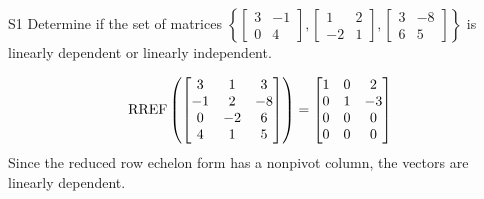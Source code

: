 \documentclass{sbgLAquiz}
\begin{document}
\begin{problem}{S1} 
Determine if the set of matrices $\left\{\begin{bmatrix} 3 & -1 \\ 0 & 4 \end{bmatrix}, \begin{bmatrix} 1  & 2 \\ -2 & 1 \end{bmatrix}, \begin{bmatrix} 3 & -8 \\ 6 & 5 \end{bmatrix} \right\}$  is linearly dependent or linearly independent.
\end{problem}
\begin{solution}
$$\operatorname{RREF}\left(\begin{bmatrix} 3 & 1 & 3 \\ -1 & 2 & -8 \\ 0 & -2 & 6 \\ 4 & 1 & 5 \end{bmatrix} \right) = \begin{bmatrix} 1 & 0 & 2 \\ 0 & 1 & -3 \\ 0 & 0 & 0 \\ 0 & 0 & 0 \end{bmatrix}$$
Since the reduced row echelon form has a nonpivot column, the vectors are linearly dependent.
\end{solution}
\end{document}

